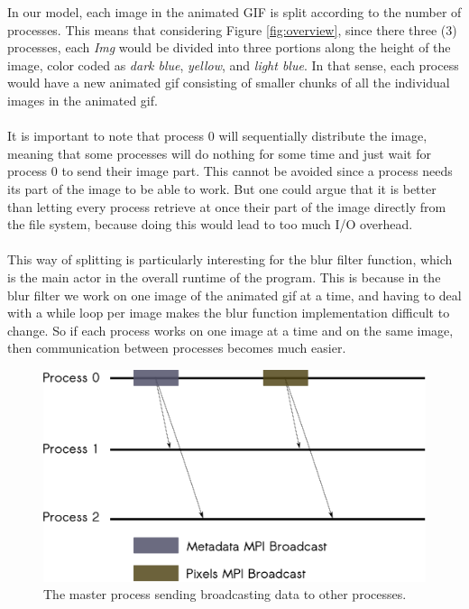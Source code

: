 \documentclass[11pt]{article}
\begin{document}
In our model, each image in the animated GIF is split according to the number of processes. This means that considering Figure \ref{fig:overview}, since there three (3) processes, each \textit{Img} would be divided into three portions along the height of the image, color coded as \textit{dark blue}, \textit{yellow}, and \textit{light blue}.
In that sense, each process would have a new animated gif consisting of smaller chunks of all the individual images in the animated gif. \\\\
It is important to note that process 0 will sequentially distribute the image, meaning that some processes will do nothing for some time and just wait for process 0 to send their image part. This cannot be avoided since a process needs its part of the image to be  able to work. But one could argue that it is better than letting every process retrieve at once their part of the image directly from the file system, because doing this would lead to too much I/O overhead. \\
\\
This way of splitting is particularly interesting for the blur filter function, which is the main actor in the overall runtime of the program. This is because in the blur filter we work on one image of the animated gif at a time, and having to deal with a while loop per image makes the blur function implementation difficult to change. So if each process works on one image at a time and on the same image, then communication between processes becomes much  easier.
\\
\begin{figure}[H]
	\centering
	\includegraphics[scale=0.6]{MPI_Bcast.eps}
	\caption{The master process sending broadcasting data to other processes.}
\end{figure}
\end{document}
